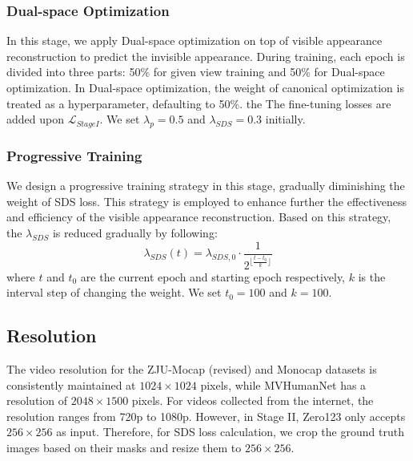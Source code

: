 \subsubsection{Dual-space Optimization}
In this stage, we apply Dual-space optimization on top of visible appearance reconstruction to predict the invisible appearance. During training, each epoch is divided into three parts: 50\% for given view training and 50\% for Dual-space optimization. In Dual-space optimization, the weight of canonical optimization is treated as a hyperparameter, defaulting to 50\%. the The fine-tuning losses are added upon $\mathcal{L}_{StageI}$. We set $\lambda_{p} = 0.5 $ and  $\lambda_{SDS} = 0.3 $ initially. 

\subsubsection{Progressive Training}
We design a progressive training strategy in this stage, gradually diminishing the weight of SDS loss. This strategy is employed to enhance further the effectiveness and efficiency of the visible appearance reconstruction. Based on this strategy, the $\lambda_{SDS}$ is reduced gradually by following:
\begin{equation}
\lambda_{SDS}(t) = \lambda_{SDS,0} \cdot \frac{1}{2^{\lfloor \frac{t - t_{\text{0}}}{k} \rfloor}}
  \label{eq:prog.train}
\end{equation}
where $t$ and $t_{0}$ are the current epoch and starting epoch respectively, $k$ is the interval step of changing the weight. We set $t_{0} = 100$ and $k = 100$.

\subsection{Resolution}
The video resolution for the ZJU-Mocap (revised)\cite{liu2023zero1to3} and Monocap datasets is consistently maintained at $1024\times1024$ pixels, while MVHumanNet\cite{xiong2024mvhumannet} has a resolution of $2048\times1500$ pixels. For videos collected from the internet, the resolution ranges from 720p to 1080p. However, in Stage II, Zero123 only accepts $256\times256$ as input. Therefore, for SDS loss calculation, we crop the ground truth images based on their masks and resize them to $256\times256$.

 


